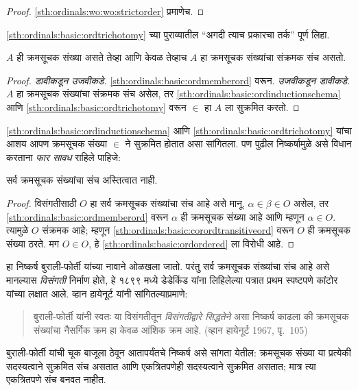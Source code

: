 \begin{proof}
\ref{sth:ordinals:wo:wo:strictorder} प्रमाणेच.
\end{proof}

\begin{prob}
\ref{sth:ordinals:basic:ordtrichotomy} च्या पुराव्यातील ``अगदी त्याच प्रकारचा तर्क'' पूर्ण लिहा.
\end{prob}

\begin{cor}\label{sth:ordinals:basic:corordtransitiveord}
$A$ ही क्रमसूचक संख्या असते तेव्हा आणि केवळ तेव्हाच $A$ हा क्रमसूचक संख्यांचा संक्रमक संच असतो.
\end{cor}

\begin{proof}
\emph{डावीकडून उजवीकडे.} \ref{sth:ordinals:basic:ordmemberord} वरून. \emph{उजवीकडून डावीकडे.} $A$ हा क्रमसूचक संख्यांचा संक्रमक संच असेल, तर \ref{sth:ordinals:basic:ordinductionschema} आणि \ref{sth:ordinals:basic:ordtrichotomy} वरून $\in$ हा $A$ ला सुक्रमित करतो.
\end{proof}

\ref{sth:ordinals:basic:ordinductionschema} आणि \ref{sth:ordinals:basic:ordtrichotomy} यांचा आशय आपण क्रमसूचक संख्या $\in$ ने सुक्रमित होतात असा सांगितला. पण पुढील निष्कर्षामुळे असे विधान करताना \emph{फार सावध} राहिले पाहिजे:

\begin{thm}[बुराली-फोर्ती विरोधापत्ती]\label{sth:ordinals:basic:buraliforti}
सर्व क्रमसूचक संख्यांचा संच अस्तित्वात नाही.
\end{thm}

\begin{proof}
विसंगतीसाठी $O$ हा सर्व क्रमसूचक संख्यांचा संच आहे असे मानू. $\alpha \in
\beta \in O$ असेल, तर \ref{sth:ordinals:basic:ordmemberord} वरून $\alpha$ ही क्रमसूचक संख्या आहे आणि म्हणून $\alpha \in O$. त्यामुळे $O$ संक्रमक आहे; म्हणून \ref{sth:ordinals:basic:corordtransitiveord} वरून $O$ ही क्रमसूचक संख्या ठरते. मग $O \in O$, हे \ref{sth:ordinals:basic:ordordered} ला विरोधी आहे.
\end{proof}
\noindent
हा निष्कर्ष बुराली-फोर्ती यांच्या नावाने ओळखला जातो. परंतु सर्व क्रमसूचक संख्यांचा संच आहे असे मानल्यास \emph{विसंगती} निर्माण होते, हे १८९९ मध्ये डेडेकिंड यांना लिहिलेल्या पत्रात प्रथम स्पष्टपणे कांटोर यांच्या लक्षात आले. व्हान हायेनूर्ट यांनी सांगितल्याप्रमाणे:
\begin{quote}
  बुराली-फोर्ती यांनी स्वतः या विसंगतीतून \emph{विसंगतीद्वारे सिद्धतेने} असा निष्कर्ष काढला की क्रमसूचक संख्यांचा नैसर्गिक क्रम हा केवळ आंशिक क्रम आहे.
  (व्हान हायेनूर्ट 1967, पृ.~105)
\end{quote}
बुराली-फोर्ती यांची चूक बाजूला ठेवून आतापर्यंतचे निष्कर्ष असे सांगता येतील: क्रमसूचक संख्या या प्रत्येकी सदस्यत्वाने सुक्रमित संच असतात आणि एकत्रितपणेही सदस्यत्वाने सुक्रमित असतात; मात्र त्या एकत्रितपणे संच बनवत नाहीत.


